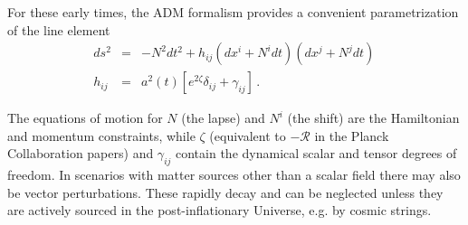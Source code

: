 

For these early times, the ADM formalism \cite{Arnowitt:1962hi}
provides a convenient parametrization of the line element
\begin{eqnarray}
\label{eq:metric}
ds^2&=&-N^2dt^2 +h_{ij}(dx^i+N^idt)(dx^j+N^jdt)\,\nonumber\\
h_{ij}&=&a^2(t)[e^{2\zeta}\delta_{ij}+\gamma_{ij}]\,.
\end{eqnarray}

The equations of motion for $N$ (the lapse) and $N^i$ (the shift) are the Hamiltonian and momentum constraints, while $\zeta$ (equivalent to $-\mathcal{R}$ in the Planck Collaboration papers) and $\gamma_{ij}$ contain the dynamical scalar and tensor degrees of freedom. In scenarios with matter sources other than a scalar field there may also be vector perturbations. These rapidly decay and can be neglected unless they are actively sourced in the post-inflationary Universe, e.g. by cosmic strings.


